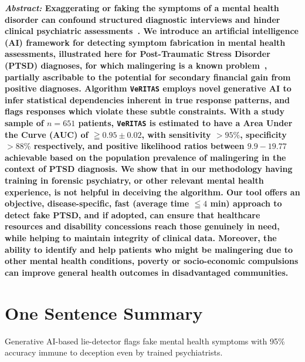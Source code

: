 \documentclass[onecolumn,10pt]{IEEEtran}
\def\vrts{\texttt{VeRITAS}\xspace}
\begin{document}
\maketitle

{\bf \sffamily \fontsize{10}{12}\selectfont \noindent   
  {\normalfont \itshape Abstract:} Exaggerating or faking  the symptoms of a mental health disorder  can confound structured diagnostic interviews and hinder clinical psychiatric assessments~\cite{Rogers1997,rogers2008clinical}.  We introduce an  artificial intelligence (AI) framework for detecting symptom fabrication in mental health assessments, illustrated here for Post-Traumatic Stress Disorder (PTSD) diagnoses, for which malingering is a known problem~\cite{frueh2007us,taylor2007detection}, partially ascribable to the  potential for secondary financial gain from positive diagnoses.  Algorithm \vrts employs novel generative AI to infer statistical dependencies inherent in true response patterns, and flags  responses which violate these subtle  constraints.  With a study sample of $n=651$ patients, \vrts is estimated to have a   Area Under the Curve (AUC) of $\geqq 0.95\pm 0.02$, with  sensitivity $>95\%$, specificity $>88\%$ respectively, and positive likelihood ratios between $9.9 - 19.77$ achievable based on the population prevalence of malingering in the context of PTSD diagnosis. We show that in our methodology having training in forensic psychiatry, or other relevant mental health experience, is not helpful in deceiving  the algorithm. Our tool   offers an  objective, disease-specific, fast (average time $\leqq 4$ min)  approach to detect fake  PTSD, and if adopted, can  ensure that healthcare resources and disability concessions reach  those genuinely in need,  while  helping to maintain  integrity of clinical data. Moreover, the ability to identify and help  patients who might be malingering due to other mental health conditions, poverty or   socio-economic compulsions can  improve general health outcomes  in disadvantaged communities.  
}

\vspace{10pt}
 

\section*{One Sentence Summary}
Generative AI-based lie-detector flags fake mental health symptoms with 95\% accuracy immune to deception even by trained psychiatrists.
\end{document}
